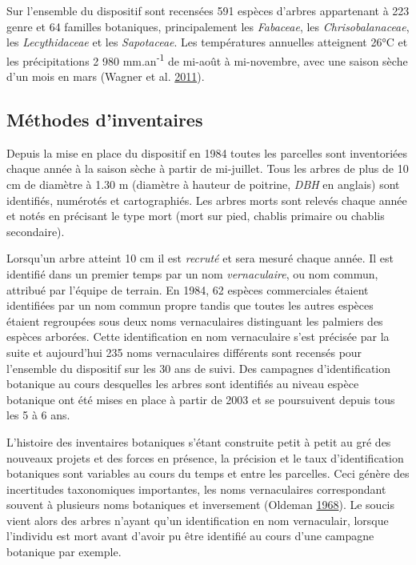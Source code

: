 \documentclass[11pt,french,A4paper,extrafontsizes,onecolumn,openright]{memoir}
\begin{document}
Sur l'ensemble du dispositif sont recensées 591 espèces d'arbres
appartenant à 223 genre et 64 familles botaniques, principalement les
\emph{Fabaceae}, les \emph{Chrisobalanaceae}, les \emph{Lecythidaceae}
et les \emph{Sapotaceae}. Les températures annuelles atteignent 26°C et
les précipitations 2 980 mm.an\textsuperscript{-1} de mi-août à
mi-novembre, avec une saison sèche d'un mois en mars (Wagner et al.
\protect\hyperlink{ref-Wagner2011}{2011}).

\subsection{Méthodes d'inventaires}\label{methodes-dinventaires}

Depuis la mise en place du dispositif en 1984 toutes les parcelles sont
inventoriées chaque année à la saison sèche à partir de mi-juillet. Tous
les arbres de plus de 10 cm de diamètre à 1.30 m (diamètre à hauteur de
poitrine, \emph{DBH} en anglais) sont identifiés, numérotés et
cartographiés. Les arbres morts sont relevés chaque année et notés en
précisant le type mort (mort sur pied, chablis primaire ou chablis
secondaire).

Lorsqu'un arbre atteint 10 cm il est \emph{recruté} et sera mesuré
chaque année. Il est identifié dans un premier temps par un nom
\emph{vernaculaire}, ou nom commun, attribué par l'équipe de terrain. En
1984, 62 espèces commerciales étaient identifiées par un nom commun
propre tandis que toutes les autres espèces étaient regroupées sous deux
noms vernaculaires distinguant les palmiers des espèces arborées. Cette
identification en nom vernaculaire s'est précisée par la suite et
aujourd'hui 235 noms vernaculaires différents sont recensés pour
l'ensemble du dispositif sur les 30 ans de suivi. Des campagnes
d'identification botanique au cours desquelles les arbres sont
identifiés au niveau espèce botanique ont été mises en place à partir de
2003 et se poursuivent depuis tous les 5 à 6 ans.

L'histoire des inventaires botaniques s'étant construite petit à petit
au gré des nouveaux projets et des forces en présence, la précision et
le taux d'identification botaniques sont variables au cours du temps et
entre les parcelles. Ceci génère des incertitudes taxonomiques
importantes, les noms vernaculaires correspondant souvent à plusieurs
noms botaniques et inversement (Oldeman
\protect\hyperlink{ref-Oldeman1968}{1968}). Le soucis vient alors des
arbres n'ayant qu'un identification en nom vernaculair, lorsque
l'individu est mort avant d'avoir pu être identifié au cours d'une
campagne botanique par exemple.
\end{document}
